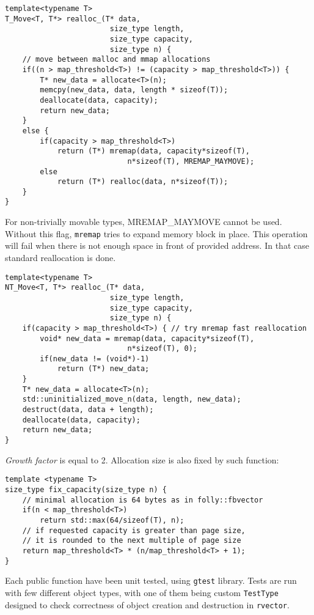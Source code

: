 \documentclass[inz, english, shortabstract]{iithesis}
\begin{document}
\begin{lstlisting}[caption=rvector trivial type reallocation]
template<typename T>
T_Move<T, T*> realloc_(T* data, 
						size_type length, 
						size_type capacity, 
						size_type n) {
	// move between malloc and mmap allocations
	if((n > map_threshold<T>) != (capacity > map_threshold<T>)) {
        T* new_data = allocate<T>(n);
        memcpy(new_data, data, length * sizeof(T));
        deallocate(data, capacity);
        return new_data;
    }
    else {
        if(capacity > map_threshold<T>)
        	return (T*) mremap(data, capacity*sizeof(T), 
                    		n*sizeof(T), MREMAP_MAYMOVE);
        else
        	return (T*) realloc(data, n*sizeof(T));
    }
}
\end{lstlisting}
For non-trivially movable types, MREMAP\_MAYMOVE cannot be used. Without this flag, {\tt mremap} tries to expand memory block in place. This operation will fail when there is not enough space in front of provided address. In that case standard reallocation is done.

\begin{lstlisting}[caption=rvector nontrivial type reallocation]
template<typename T>
NT_Move<T, T*> realloc_(T* data, 
						size_type length, 
						size_type capacity, 
						size_type n) {
    if(capacity > map_threshold<T>) { // try mremap fast reallocation
        void* new_data = mremap(data, capacity*sizeof(T), 
                    		n*sizeof(T), 0);
        if(new_data != (void*)-1)
        	return (T*) new_data;
    }
    T* new_data = allocate<T>(n);
    std::uninitialized_move_n(data, length, new_data);
    destruct(data, data + length);
    deallocate(data, capacity);
    return new_data;
}
\end{lstlisting}
\emph{Growth factor} is equal to 2. Allocation size is also fixed by such function: 

\begin{lstlisting}[caption=fix capacity]
template <typename T>
size_type fix_capacity(size_type n) {
	// minimal allocation is 64 bytes as in folly::fbvector
	if(n < map_threshold<T>)
        return std::max(64/sizeof(T), n);
    // if requested capacity is greater than page size,
    // it is rounded to the next multiple of page size
    return map_threshold<T> * (n/map_threshold<T> + 1);
}
\end{lstlisting}
Each public function have been unit tested, using {\tt gtest} library\cite{rvector_tests}. Tests are run with few different object types, with one of them being custom {\tt TestType} designed to check correctness of object creation and destruction in {\tt rvector}.
\end{document}
